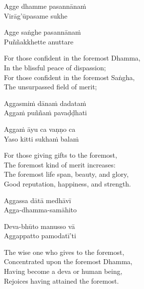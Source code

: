 \begin{pali-hang}
  Agge dhamme pasannānaṁ\\
  Virāg'ūpasame sukhe
\end{pali-hang}
\begin{pali-hang-together}
  Agge saṅghe pasannānaṁ\\
  Puññakkhette anuttare
\end{pali-hang-together}

\begin{english-verses}
  For those confident in the foremost Dhamma,\\
  In the blissful peace of dispassion;\\
  For those confident in the foremost Saṅgha,\\
  The unsurpassed field of merit;
\end{english-verses}

\ifninebythirteen\clearpage\fi

\begin{pali-hang}
  Aggasmiṁ dānaṁ dadataṁ\\
  Aggaṁ puññaṁ pavaḍḍhati
\end{pali-hang}
\begin{pali-hang-together}
  Aggaṁ āyu ca vaṇṇo ca\\
  Yaso kitti sukhaṁ balaṁ
\end{pali-hang-together}

\ifbfive\clearpage\fi

\begin{english-verses}
  For those giving gifts to the foremost,\\
  The foremost kind of merit increases:\\
\ifafive\clearpage\fi
  The foremost life span, beauty, and glory,\\
  Good reputation, happiness, and strength.
\end{english-verses}

\begin{pali-hang}
  Aggassa dātā medhāvī\\
  Agga-dhamma-samāhito
\end{pali-hang}
\begin{pali-hang-together}
  Deva-bhūto manusso vā\\
  Aggappatto pamodatī'ti
\end{pali-hang-together}

\begin{english-verses}
  The wise one who gives to the foremost,\\
  Concentrated upon the foremost Dhamma,\\
  Having become a deva or human being,\\
  Rejoices having attained the foremost.
\end{english-verses}

